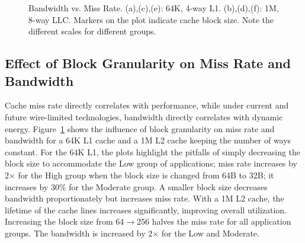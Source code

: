 \begin{figure}[ht]

  \caption[Bandwidth vs. Miss Rate]{Bandwidth vs. Miss Rate. (a),(c),(e): 64K, 4-way
    L1. (b),(d),(f): 1M, 8-way LLC.  Markers on the plot indicate cache
    block size. Note the different scales for different groups.}
  \label{fig:scatter_bw_64k_1m}
\end{figure}

\clearpage

\subsection{Effect of Block Granularity on Miss Rate and Bandwidth}

Cache miss rate directly correlates with performance, while under
current and future wire-limited technologies, bandwidth
directly correlates with dynamic energy.
Figure~\ref{fig:scatter_bw_64k_1m} shows the influence of block
granularity on miss rate and bandwidth for a 64K L1 cache and a 1M L2
cache keeping the number of ways constant. For the 64K L1, the plots
highlight the pitfalls of simply decreasing the block size to
accommodate the Low group of applications; miss rate increases by
2$\times$ for the High group when the block size is changed from 64B
to 32B; it increases by 30\% for the Moderate group. A smaller block
size decreases bandwidth proportionately but increases miss rate. With
a 1M L2 cache, the lifetime of the cache lines increases significantly, 
improving overall utilization. Increasing the block size from
64$\to$256 halves the miss rate for all application groups. 
The bandwidth is increased by 2$\times$ for the Low and Moderate.

